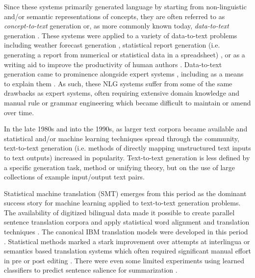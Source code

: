 Since these systems primarily generated language by starting from
non-linguistic and/or semantic representations of concepts, they are often
referred to as \textit{concept-to-text} generation or, as more commonly known
today, \textit{data-to-text} generation \citep{gatt2018survey}. These systems
were applied to a variety of data-to-text problems including weather forecast
generation \citep{goldberg1994using}, statistical report  generation (i.e.
generating a report from numerical or statistical data in a spreadsheet)
\citep{iordanskaja-etal-1992-generation}, or as a writing aid to improve the
productivity of human authors \citep{springer1991,mckeown1994,paris1995}.
Data-to-text generation came to prominence alongside expert systems
\citep{todd1992introduction}, including as a means to explain them
\citep{swartout1983xplain}.  As such, these NLG systems suffer from some of the
same drawbacks as expert systems, often requiring extensive domain knowledge
and manual rule or grammar engineering which became  difficult to maintain or
amend over time.
  
In the late 1980s and into the 1990s, as larger text corpora became available
and statistical and/or machine learning techniques spread through the
community, text-to-text generation (i.e. methods of directly mapping
unstructured text inputs to text outputs) increased in popularity.
Text-to-text generation is less defined by a specific generation task, method
or unifying theory, but on the use of large collections of example input/output
text pairs. 
  
Statistical machine translation (SMT) emerges from this period as the dominant
success story for machine learning applied to text-to-text generation problems.
The availability of digitized bilingual data made it possible to create
parallel sentence translation corpora and apply statistical word alignment and
translation techniques \citep{gale1993}.  The canonical IBM translation models
were developed in this period \citep{brown1988,brown1993}.  Statistical methods
marked a stark improvement over attempts at interlingua or semantics based
translation systems which often required significant manual effort in pre or
post editing \citep{hutchins1994}. There were even some limited experiments
using learned classifiers to predict sentence salience for summarization
\citep{kupiec1995trainable}.
